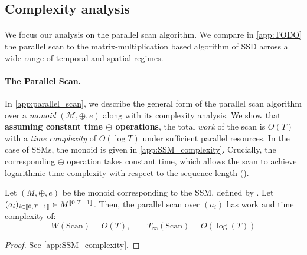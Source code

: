 \documentclass{article}
\begin{document}
\subsection{Complexity analysis}
\label{sec:complexity_analysis}

\paragraph{} We focus our analysis on the parallel scan algorithm. We compare in \cref{app:TODO} the parallel scan to the matrix-multiplication based algorithm of SSD \citep{dao2024} across a wide range of temporal and spatial regimes.

\paragraph{The Parallel Scan.} In \cref{app:parallel_scan}, we describe the general form of the parallel scan algorithm over a \emph{monoid} $(\mathcal{M}, \oplus, e)$ along with its complexity analysis. We show that \textbf{assuming constant time $\bm \oplus$ operations}, the total \emph{work} of the scan is $O(T)$ with a \emph{time complexity} of $O(\log T)$ under sufficient parallel resources. In the case of SSMs, the monoid is given in \cref{app:SSM_complexity}. Crucially, the corresponding $\oplus$ operation takes constant time, which allows the scan to achieve logarithmic time complexity with respect to the sequence length ().

\begin{proposition}
\label{prop:SSM_complexity}
    Let $(M, \oplus, e)$ be the monoid corresponding to the SSM, defined by . Let $(a_i)_{i\in \llbracket 0, T-1 \rrbracket}\in M^{\llbracket 0, T-1 \rrbracket}$. Then, the parallel scan over $(a_i)$ has work and time complexity of:
\[
    W(\mathrm{Scan}) = O(T), \qquad T_\infty(\mathrm{Scan}) = O(\log(T))
\]
\end{proposition}

\begin{proof}
See \cref{app:SSM_complexity}.
\end{proof}
\end{document}
